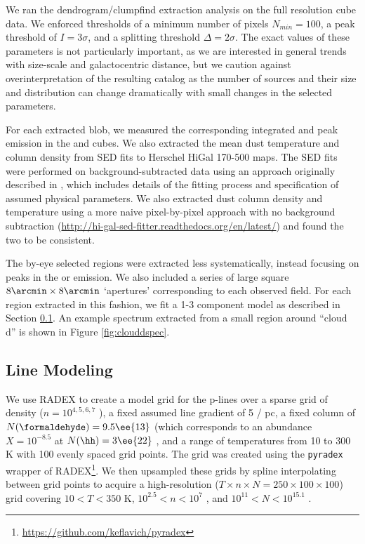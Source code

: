 We ran the dendrogram/clumpfind extraction analysis on the full resolution
\threeohthree cube data.  We enforced thresholds of a minimum number of pixels
$N_{min}=100$, a peak threshold of $I = 3\sigma$, and a splitting threshold
$\Delta = 2\sigma$.  The exact values of these parameters is not particularly
important, as we are interested in general trends with size-scale and
galactocentric distance, but we caution against overinterpretation of the
resulting catalog as the number of sources and their size and distribution can
change dramatically with small changes in the selected parameters.

For each extracted blob, we measured the corresponding integrated and peak
emission in the \threetwoone and \thirteenco cubes.  We also extracted the mean
dust temperature and column density from SED fits to Herschel HiGal 170-500\um
maps.  The SED fits were performed on background-subtracted data using an
approach originally described in \citet{Battersby2011a}, which includes details
of the fitting process and specification of assumed physical parameters.  We
also extracted dust column density and temperature using a more naive
pixel-by-pixel approach with no background subtraction
(\url{http://hi-gal-sed-fitter.readthedocs.org/en/latest/}) and found the two
to be consistent.

The by-eye selected regions were extracted less systematically, instead
focusing on peaks in the \threeohthree or \threetwoone emission.  We also
included a series of large square $8\arcmin \times 8\arcmin$ `apertures'
corresponding to each observed field.  For each region extracted in this
fashion, we fit a 1-3 component model as described in Section
\ref{sec:linemodeling}.  An example spectrum extracted from a small region
around ``cloud d'' is shown in Figure \ref{fig:clouddspec}.


\subsection{Line Modeling}
\label{sec:linemodeling}
We use RADEX \citet{van-Der-Tak2007a} to create a model grid for the
p-\formaldehyde lines over a sparse grid of density ($n=10^{4,5,6,7}$ \percc),
a fixed assumed line gradient of 5 \kms / pc, a fixed column of \formaldehyde
$N(\formaldehyde) = 9.5\ee{13}$ \persc (which corresponds to an abundance
$X=10^{-8.5}$ at $N(\hh) = 3\ee{22}$ \persc, and a range of temperatures from
10 to 300 K with 100 evenly spaced grid points.  The grid was created using
the \texttt{pyradex} wrapper of
RADEX\footnote{\url{https://github.com/keflavich/pyradex}}.
We then upsampled these grids by spline interpolating between grid points to
acquire a high-resolution ($T\times n \times N = 250\times100\times100$) grid
covering $10<T<350$ K, $10^{2.5} < n < 10^7$ \percc, and $10^{11} < N <
10^{15.1}$ \persc\perkmspc.

